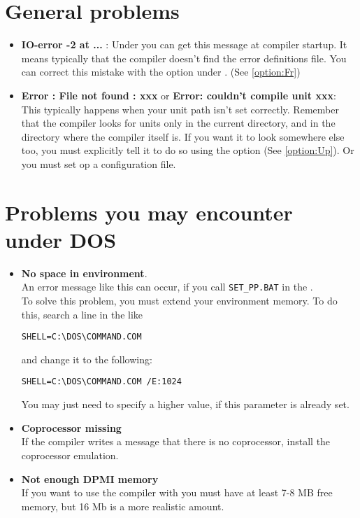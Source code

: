 \documentclass{report}
\newcommand{\seeo}[1]{See \ref{option:#1}}
\begin{document}
\section{General problems}
\begin{itemize}
\item \textbf{IO-error -2 at ...} : Under \linux you can get this message at
compiler startup. It means typically that the compiler doesn't find the
error definitions file. You can correct this mistake with the 
option under \linux. (\seeo{Fr})
\item \textbf {Error : File not found : xxx} or \textbf{Error: couldn't compile
unit xxx}: This typically happens when
your unit path isn't set correctly. Remember that the compiler looks for
units only in the current directory, and in the directory where the compiler
itself is. If you want it to look somewhere else too, you must explicitly
tell it to do so using the  option (\seeo{Up}). Or you must set op
a configuration file.
\end{itemize}

\section{Problems you may encounter under DOS}
\begin{itemize}
\item \textbf{No space in environment}.\\
An error message like this can occur, if you call 
\verb|SET_PP.BAT| in the .\\
To solve this problem, you must extend your environment memory.
To do this, search a line in the  like
\begin{verbatim}
SHELL=C:\DOS\COMMAND.COM
\end{verbatim}
and change it to the following: 
\begin{verbatim}
SHELL=C:\DOS\COMMAND.COM /E:1024
\end{verbatim}
You may just need to specify a higher value, if this parameter is already set.
\item \textbf{ Coprocessor missing}\\ 
If the compiler writes
a message that there is no coprocessor, install
the coprocessor emulation.
\item \textbf{Not enough DPMI memory}\\ 
If you want to use the compiler with  you must have at least
7-8 MB free  memory, but 16 Mb is a more realistic amount.
\end{itemize}
\end{document}
